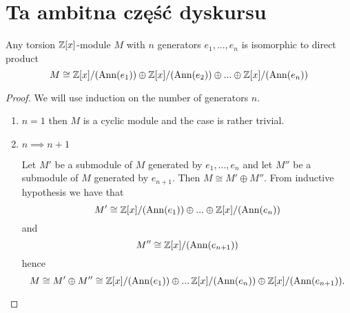 \section{Ta ambitna część dyskursu}
%
%
%
%

\begin{theorem}\label{rozklad torsyjnego}
  Any torsion $\operatorname{\mathbb{Z}}[x]$-module $M$ with $n$ generators $e_1,...,e_n$ is isomorphic to direct product
  $$M\cong \operatorname{\mathbb{Z}}[x]/(\operatorname{Ann}(e_1))\oplus \operatorname{\mathbb{Z}}[x]/(\operatorname{Ann}(e_2))\oplus...\oplus \operatorname{\mathbb{Z}}[x]/(\operatorname{Ann}(e_n))$$
\end{theorem}

\begin{proof}
  We will use induction on the number of generators $n$.
  \begin{enumerate}
    \item $n=1$ then $M$ is a cyclic module and the case is rather trivial.
    \item $n\implies n+1$

      Let $M'$ be a submodule of $M$ generated by $e_1,...,e_n$ and let $M''$ be a submodule of $M$ generated by $e_{n+1}$. Then $M\cong M'\oplus M''$. From inductive hypothesis we have that 
      $$M'\cong \operatorname{\mathbb{Z}}[x]/(\operatorname{Ann}(e_1))\oplus...\oplus \operatorname{\mathbb{Z}}[x]/(\operatorname{Ann}(e_n))$$
      and
      $$M''\cong \operatorname{\mathbb{Z}}[x]/(\operatorname{Ann}(e_{n+1}))$$
      hence
      $$M\cong M'\oplus M''\cong\operatorname{\mathbb{Z}}[x]/(\operatorname{Ann}(e_1))\oplus...\operatorname{\mathbb{Z}}[x]/(\operatorname{Ann}(e_n))\oplus\operatorname{\mathbb{Z}}[x]/(\operatorname{Ann}(e_{n+1})).$$
  \end{enumerate}
\end{proof}

